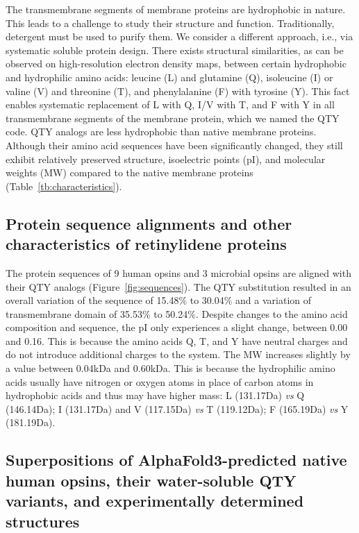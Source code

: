 \documentclass[fleqn, 10pt, lineno]{manuscript}
\begin{document}
The transmembrane segments of membrane proteins are hydrophobic in nature. This leads to a challenge to study their structure and function. Traditionally, detergent must be used to purify them. We consider a different approach, i.e., via systematic soluble protein design. There exists structural similarities, as can be observed on high-resolution electron density maps, between certain hydrophobic and hydrophilic amino acids: leucine (L) and glutamine (Q), isoleucine (I) or valine (V) and threonine (T), and phenylalanine (F) with tyrosine (Y). This fact enables systematic replacement of L with Q, I/V with T, and F with Y in all transmembrane segments of the membrane protein, which we named the QTY code. QTY analogs are less hydrophobic than native membrane proteins. Although their amino acid sequences have been significantly changed, they still exhibit relatively preserved structure, isoelectric points (pI), and molecular weights (MW) compared to the native membrane proteins (Table~\ref{tb:characteristics}). 

\subsection*{Protein sequence alignments and other characteristics of retinylidene proteins}

The protein sequences of 9 human opsins and 3 microbial opsins are aligned with their QTY analogs (Figure~\ref{fig:sequences}). The QTY substitution resulted in an overall variation of the sequence of 15.48\% to 30.04\% and a variation of transmembrane domain of 35.53\% to 50.24\%. Despite changes to the amino acid composition and sequence, the pI only experiences a slight change, between 0.00 and 0.16. This is because the amino acids Q, T, and Y have neutral charges and do not introduce additional charges to the system.  The MW increases slightly by a value between 0.04kDa and 0.60kDa. This is because the hydrophilic amino acids usually have nitrogen or oxygen atoms in place of carbon atoms in hydrophobic acids and thus may have higher mass: L (131.17Da) \textit{vs} Q (146.14Da); I (131.17Da) and V (117.15Da) \textit{vs} T (119.12Da); F (165.19Da) \textit{vs} Y (181.19Da). 

\subsection*{Superpositions of AlphaFold3-predicted native human opsins, their water-soluble QTY variants, and experimentally determined structures}
\end{document}

